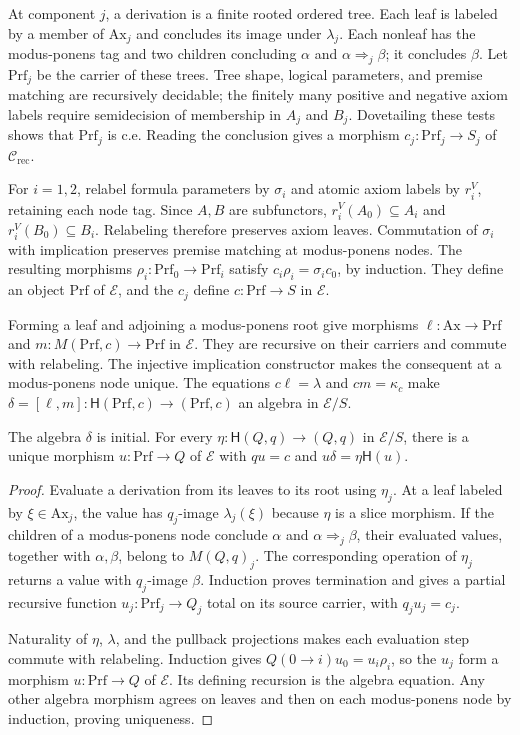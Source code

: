 At component $j$, a derivation is a finite rooted ordered tree.
Each leaf is labeled by a member of $\mathrm{Ax}_j$ and concludes
its image under $\lambda_j$. Each nonleaf has the modus-ponens tag
and two children concluding $\alpha$ and
$\alpha\Rightarrow_j\beta$; it concludes $\beta$. Let
$\mathrm{Prf}_j$ be the carrier of these trees. Tree shape, logical
parameters, and premise matching are recursively decidable; the
finitely many positive and negative axiom labels require semidecision
of membership in $A_j$ and $B_j$. Dovetailing these tests shows that
$\mathrm{Prf}_j$ is c.e. Reading the conclusion gives a morphism
$c_j:\mathrm{Prf}_j\to S_j$ of $\mathcal C_{\mathrm{rec}}$.

For $i=1,2$, relabel formula parameters by $\sigma_i$ and atomic
axiom labels by $r_i^V$, retaining each node tag. Since $A,B$ are
subfunctors, $r_i^V(A_0)\subseteq A_i$ and
$r_i^V(B_0)\subseteq B_i$. Relabeling therefore preserves axiom
leaves. Commutation of $\sigma_i$ with implication preserves premise
matching at modus-ponens nodes. The resulting morphisms
$\rho_i:\mathrm{Prf}_0\to\mathrm{Prf}_i$ satisfy
$c_i\rho_i=\sigma_i c_0$, by induction. They define an object
$\mathrm{Prf}$ of $\mathcal E$, and the $c_j$ define
$c:\mathrm{Prf}\to S$ in $\mathcal E$.

Forming a leaf and adjoining a modus-ponens root give morphisms
$\ell:\mathrm{Ax}\to\mathrm{Prf}$ and
$m:M(\mathrm{Prf},c)\to\mathrm{Prf}$ in $\mathcal E$.
They are recursive on their carriers and commute with relabeling.
The injective implication constructor makes the consequent at a
modus-ponens node unique. The equations
$c\ell=\lambda$ and $cm=\kappa_c$ make
$\delta=[\ell,m]:\mathsf H(\mathrm{Prf},c)\to(\mathrm{Prf},c)$
an algebra in $\mathcal E/S$.

\begin{proposition}\label{prop:fork-proof-initial}
The algebra $\delta$ is initial. For every
$\eta:\mathsf H(Q,q)\to(Q,q)$ in $\mathcal E/S$, there is a
unique morphism $u:\mathrm{Prf}\to Q$ of $\mathcal E$ with
$qu=c$ and $u\delta=\eta\mathsf H(u)$.
\end{proposition}
\begin{proof}
Evaluate a derivation from its leaves to its root using $\eta_j$.
At a leaf labeled by $\xi\in\mathrm{Ax}_j$, the value has
$q_j$-image $\lambda_j(\xi)$ because $\eta$ is a slice morphism.
If the children of a modus-ponens node conclude $\alpha$ and
$\alpha\Rightarrow_j\beta$, their evaluated values, together
with $\alpha,\beta$, belong to $M(Q,q)_j$. The corresponding
operation of $\eta_j$ returns a value with $q_j$-image $\beta$.
Induction proves termination and gives a partial recursive function
$u_j:\mathrm{Prf}_j\to Q_j$ total on its source carrier, with
$q_ju_j=c_j$.

Naturality of $\eta$, $\lambda$, and the pullback projections
makes each evaluation step commute with relabeling. Induction gives
$Q(0\to i)u_0=u_i\rho_i$, so the $u_j$ form a morphism
$u:\mathrm{Prf}\to Q$ of $\mathcal E$. Its defining recursion
is the algebra equation. Any other algebra morphism agrees on
leaves and then on each modus-ponens node by induction, proving
uniqueness.
\end{proof}

